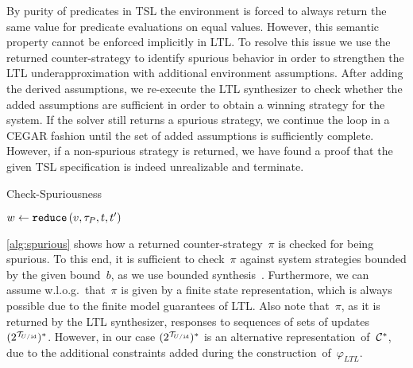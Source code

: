By purity of predicates in TSL the environment is forced to
always return the same value for predicate evaluations on equal
values. However, this semantic property cannot be enforced implicitly
in LTL.  To resolve this issue we use the returned counter-strategy to
identify spurious behavior in order to strengthen the LTL
underapproximation with additional environment assumptions.
After adding the derived assumptions, we re-execute the LTL synthesizer to check whether the
added assumptions are sufficient in order to obtain a winning strategy
for the system.  If the solver still returns a spurious strategy, we
continue the loop in a CEGAR fashion until the set of added
assumptions is sufficiently complete.  However, if a non-spurious strategy is
returned, we have found a proof that the given
TSL specification is indeed unrealizable and terminate.

\goodbreak

\begin{algorithm}[t]
  \small
  \caption{Check-Spuriousness} \label{alg:spurious}
  \begin{algorithmic}[1]

    \vspace{0.3em}

      \State \quad $ w \gets \texttt{reduce}\,(v,\tau_{P},t,t') $
      \State {}
      \EndIf
    \EndFor
  \end{algorithmic}
  \vspace{-0.2em}
\end{algorithm}

\cref{alg:spurious} shows how a returned counter-strategy~$ \pi $ is
checked for being spurious. To this end, it is sufficient to
check~$ \pi $ against system strategies bounded by the given
bound~$ b $, as we use bounded
synthesis~\cite{Schewe:2013}. Furthermore, we can assume w.l.o.g.\
that~$ \pi $ is given by a finite state representation, which is
always possible due to the finite model guarantees of LTL. Also note
that~$ \pi $, as it is returned by the LTL synthesizer, responses to
sequences of sets of updates~$ (2^{\mathcal{T}_{\hspace{-0.5pt}U / {\text{\texttt{id}}}}})^{*} $. However, in our
case $ (2^{\mathcal{T}_{\hspace{-0.5pt}U / {\text{\texttt{id}}}}})^{*} $ is an alternative
representation~of~$ \mathcal{C}^{*} $, due to the additional constraints
added during the construction~of~$ \varphi_{\textit{LTL}} $.

